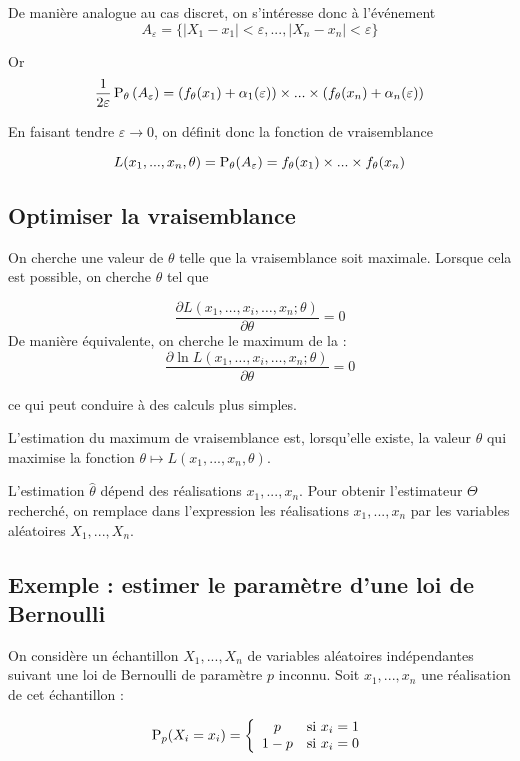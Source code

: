 De manière analogue au cas discret, on s'intéresse donc à l'événement 
$$A_{\varepsilon} = \{|X_1-x_1|<\varepsilon,...,|X_n-x_n|<\varepsilon\}$$

Or $$ \frac{1}{2\varepsilon} \operatorname{P}_{\theta}\left(A_{\varepsilon}\right) = \left(f_{\theta}(x_1)+\alpha_1(\varepsilon)\right) \times ... \times \left(f_{\theta}(x_n)+\alpha_n(\varepsilon)\right)$$

En faisant tendre $\varepsilon \to 0$, on définit donc la fonction de vraisemblance 

$$L(x_1,...,x_n, \theta) = \operatorname{P}_\theta(A_{\varepsilon}) = f_{\theta}(x_1) \times ... \times f_{\theta}(x_n)$$

\subsection{Optimiser la vraisemblance}

On cherche une valeur de $\theta$ telle que la vraisemblance soit maximale. Lorsque cela est possible, on cherche $\theta$ tel que 

$${\frac {\partial L(x_{1},\ldots ,x_{i},\ldots ,x_{n};\theta )}{\partial \theta }}=0 $$
De manière équivalente, on cherche le maximum de la  :
$${\frac {\partial \ln L(x_{1},\ldots ,x_{i},\ldots ,x_{n};\theta )}{\partial \theta }}=0 $$

ce qui peut conduire à des calculs plus simples. 

\begin{definition}{}{}
	L'estimation du maximum de vraisemblance est, lorsqu'elle existe, la valeur $\hat{\theta}$ qui maximise la fonction $\theta \mapsto L(x_1,...,x_n, \theta)$. 
\end{definition}

L'estimation $\hat{\theta}$ dépend des réalisations $x_1,...,x_n$. Pour obtenir l'estimateur $\Theta$ recherché, on remplace dans l'expression les réalisations $x_1,...,x_n$ par les variables aléatoires $X_1,...,X_n$.

\subsection{Exemple : estimer le paramètre d'une loi de Bernoulli}

On considère un échantillon $X_1,...,X_n$ de variables aléatoires indépendantes suivant une loi de Bernoulli de paramètre $p$ inconnu. Soit $x_1,...,x_n$ une réalisation de cet échantillon :

$$\operatorname{P}_p(X_i=x_i)=\left\{\begin{array}{cl}
p&\text{si $x_i = 1$}\\
1-p &\text{si $x_i = 0$}
\end{array}\right.$$

